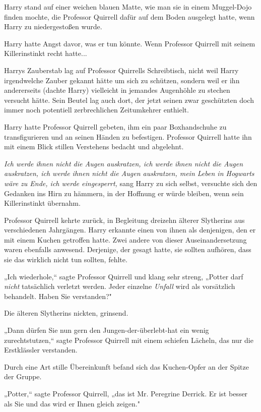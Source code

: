 {Harry stand auf einer weichen blauen Matte, wie man sie in einem Muggel-Dojo finden mochte, die Professor Quirrell dafür auf dem Boden ausgelegt hatte, wenn Harry zu niedergestoßen wurde.

Harry hatte Angst davor, was er tun könnte. Wenn Professor Quirrell mit seinem Killerinstinkt recht hatte...

Harrys Zauberstab lag auf Professor Quirrells Schreibtisch, nicht weil Harry irgendwelche Zauber gekannt hätte um sich zu schützen, sondern weil er ihn andererseits (dachte Harry) vielleicht in jemandes Augenhöhle zu stechen versucht hätte. Sein Beutel lag auch dort, der jetzt seinen zwar geschützten doch immer noch potentiell zerbrechlichen Zeitumkehrer enthielt.

Harry hatte Professor Quirrell gebeten, ihm ein paar Boxhandschuhe zu transfigurieren und an seinen Händen zu befestigen. Professor Quirrell hatte ihn mit einem Blick stillen Verstehens bedacht und abgelehnt.

\emph{Ich werde ihnen nicht die Augen auskratzen, ich werde ihnen nicht die Augen auskratzen, ich werde ihnen nicht die Augen auskratzen, mein Leben in Hogwarts wäre zu Ende, ich werde eingesperrt,} sang Harry zu sich selbst, versuchte sich den Gedanken ins Hirn zu hämmern, in der Hoffnung er würde bleiben, wenn sein Killerinstinkt übernahm.

Professor Quirrell kehrte zurück, in Begleitung dreizehn älterer Slytherins aus verschiedenen Jahrgängen. Harry erkannte einen von ihnen als denjenigen, den er mit einem Kuchen getroffen hatte. Zwei andere von dieser Auseinandersetzung waren ebenfalls anwesend. Derjenige, der gesagt hatte, sie sollten aufhören, dass sie das wirklich nicht tun sollten, fehlte.

„Ich wiederhole,“ sagte Professor Quirrell und klang sehr streng, „Potter darf \emph{nicht} tatsächlich verletzt werden. Jeder einzelne \emph{Unfall} wird als vorsätzlich behandelt. Haben Sie verstanden?"

Die älteren Slytherins nickten, grinsend.

„Dann dürfen Sie nun gern den Jungen-der-überlebt-hat ein wenig zurechtstutzen,“ sagte Professor Quirrell mit einem schiefen Lächeln, das nur die Erstklässler verstanden.

Durch eine Art stille Übereinkunft befand sich das Kuchen-Opfer an der Spitze der Gruppe.

„Potter,“ sagte Professor Quirrell, „das ist Mr. Peregrine Derrick. Er ist besser als Sie und das wird er Ihnen gleich zeigen."

}
